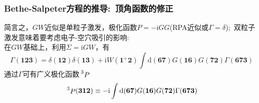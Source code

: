 {\frame
{
	\frametitle{\textrm{Bethe-Salpeter}方程的推导:~顶角函数的修正}
	简言之，$GW$近似是单粒子激发，极化函数$P=-\mathrm{i}GG$(\textrm{RPA}近似或$\Gamma=\delta$);~双粒子激发意味着要考虑电子-空穴吸引的影响:\\
	在$GW$基础上，利用$\Sigma=\mathrm{i}GW$，有
	\begin{displaymath}
		\Gamma(\mathbf{123})=\delta(\mathbf{12})\delta(\mathbf{13})+\mathrm{i}W(\mathbf{1}^+\mathbf{2})\int \mathrm{d}(\mathbf{67})G(\mathbf{16})G(\mathbf{72})\Gamma(\mathbf{673})
	\end{displaymath}
	{\fontsize{8.0pt}{6.2pt}}
	通过$\Gamma$可有广义极化函数$\sideset{^3}{}{\mathop{P}}$
	\begin{displaymath}
		\sideset{^3}{}{\mathop{P}}(\mathbf{312})\equiv-\mathrm{i}\int\mathrm{d}(\mathbf{67})G(\mathbf{16})G(\mathbf{72})\Gamma(\mathbf{673})
	\end{displaymath}
}

}
